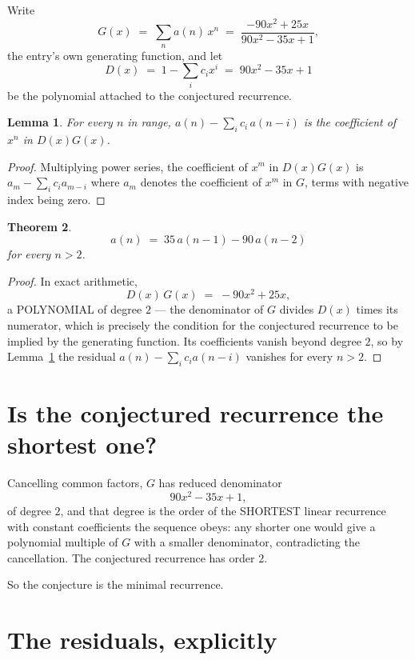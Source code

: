 \documentclass[11pt,a4paper]{article}
\theoremstyle{plain}
\newtheorem{theorem}{Theorem}
\newtheorem{lemma}[theorem]{Lemma}
\theoremstyle{definition}
\begin{document}
Write
\[
G(x)\;=\;\sum_{n}a(n)\,x^{n}\;=\;\frac{- 90 x^{2} + 25 x}{90 x^{2} - 35 x + 1},
\]
the entry's own generating function, and let
\[
D(x)\;=\;1-\sum_i c_i x^{i}\;=\;90 x^{2} - 35 x + 1
\]
be the polynomial attached to the conjectured recurrence.

\begin{lemma}\label{lem:key}
For every $n$ in range, $a(n)-\sum_i c_i\,a(n-i)$ is the coefficient of $x^{n}$ in
$D(x)G(x)$.
\end{lemma}

\begin{proof}
Multiplying power series, the coefficient of $x^{m}$ in $D(x)G(x)$ is
$a_m-\sum_i c_i a_{m-i}$ where $a_m$ denotes the coefficient of $x^{m}$ in $G$, terms with
negative index being zero.
\end{proof}

\begin{theorem}
\[
a(n)\;=\;35\,a(n-1) - 90\,a(n-2)
\]
for every $n>2$.
\end{theorem}

\begin{proof}
In exact arithmetic,
\[
D(x)\,G(x)\;=\;- 90 x^{2} + 25 x,
\]
a POLYNOMIAL of degree $2$ --- the denominator of $G$ divides $D(x)$ times its numerator,
which is precisely the condition for the conjectured recurrence to be implied by the
generating function. Its coefficients vanish beyond degree $2$, so by
Lemma~\ref{lem:key} the residual $a(n)-\sum_ic_ia(n-i)$ vanishes for every
$n>2$.
\end{proof}

\section{Is the conjectured recurrence the shortest one?}

Cancelling common factors, $G$ has reduced denominator
\[
90 x^{2} - 35 x + 1,
\]
of degree $2$, and that degree is the order of the SHORTEST linear recurrence with
constant coefficients the sequence obeys: any shorter one would give a polynomial multiple of
$G$ with a smaller denominator, contradicting the cancellation. The conjectured recurrence has
order $2$.

So the conjecture is the minimal recurrence.

\section{The residuals, explicitly}
\end{document}

